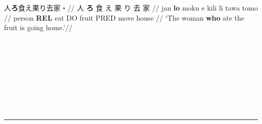 \documentclass{ctexart}
\begin{document}
{
\ex
\begingl
\glpreamble 人{\textbf{ろ}}食え果り去家・//
\gla 人 {\textbf{ろ}} 食 え 果 り 去 家 //
\glb jan {\textbf{lo}} moku e kili li tawa tomo //
\glb person {\textbf{REL}} eat DO fruit PRED move house //
\glft ‘The woman {\textbf{who}} ate the fruit is going home.’//
\endgl
\xe
}

{\Huge{}
\noindent%
\\
\\
\begin{center}
\\
\\
\end{center}
\begin{center}
\\
\\
\end{center}
}

\newpage

\begin{center}
    \vspace*{2cm}
    {\fontsize{48}{60}\bfseries\color{primary}}
    \vspace{1cm}
\end{center}
\vspace{1cm}
\hrule
\vspace{1cm}
\end{document}
